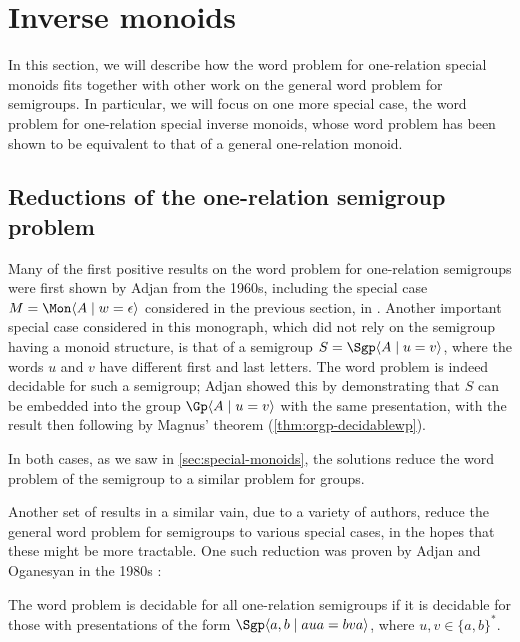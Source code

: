 \documentclass[noindex,noinsetproof,12pt]{lmaths}
\begin{document}
\section{Inverse monoids} \label{sec:inverse-monoids}

In this section, we will describe how the word problem for one-relation special monoids fits together with other work on the general word problem for semigroups. In particular, we will focus on one more special case, the word problem for one-relation special inverse monoids, whose word problem has been shown to be equivalent to that of a general one-relation monoid.

\subsection{Reductions of the one-relation semigroup problem}
Many of the first positive results on the word problem for one-relation semigroups were first shown by Adjan from the 1960s, including the special case $M = \Mon \langle A \mid w = \epsilon\rangle$ considered in the previous section, in \cite{Adian1966}. Another important special case considered in this monograph, which did not rely on the semigroup having a monoid structure, is that of a semigroup $S = \Sgp \langle A \mid u = v\rangle$, where the words $u$ and $v$ have different first and last letters. The word problem is indeed decidable for such a semigroup; Adjan showed this by demonstrating that $S$ can be embedded into the group $\Gp \langle A \mid u = v \rangle$ with the same presentation, with the result then following by Magnus' theorem (\cref{thm:orgp-decidablewp}).

In both cases, as we saw in \cref{sec:special-monoids}, the solutions reduce the word problem of the semigroup to a similar problem for groups.

Another set of results in a similar vain, due to a variety of authors, reduce the general word problem for semigroups to various special cases, in the hopes that these might be more tractable. One such reduction was proven by Adjan and Oganesyan in the 1980s \cite{Adyan1987}:

\begin{theorem} \label{thm:aua=bva}
	The word problem is decidable for all one-relation semigroups if it is decidable for those with presentations of the form $\Sgp \langle a, b \mid aua = bva \rangle$, where $u, v \in \{a, b\}^*$.
\end{theorem}
\end{document}
